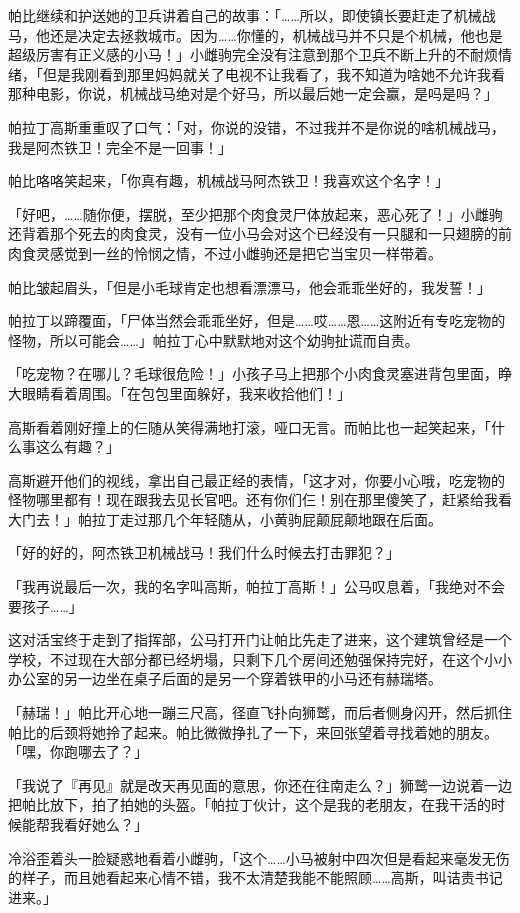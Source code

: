 帕比继续和护送她的卫兵讲着自己的故事：「……所以，即使镇长要赶走了机械战马，他还是决定去拯救城市。因为……你懂的，机械战马并不只是个机械，他也是超级厉害有正义感的小马！」小雌驹完全没有注意到那个卫兵不断上升的不耐烦情绪，「但是我刚看到那里妈妈就关了电视不让我看了，我不知道为啥她不允许我看那种电影，你说，机械战马绝对是个好马，所以最后她一定会赢，是吗是吗？」

帕拉丁高斯重重叹了口气：「对，你说的没错，不过我并不是你说的啥机械战马，我是阿杰铁卫！完全不是一回事！」

帕比咯咯笑起来，「你真有趣，机械战马阿杰铁卫！我喜欢这个名字！」

「好吧，……随你便，摆脱，至少把那个肉食灵尸体放起来，恶心死了！」小雌驹还背着那个死去的肉食灵，没有一位小马会对这个已经没有一只腿和一只翅膀的前肉食灵感觉到一丝的怜悯之情，不过小雌驹还是把它当宝贝一样带着。

帕比皱起眉头，「但是小毛球肯定也想看漂漂马，他会乖乖坐好的，我发誓！」

帕拉丁以蹄覆面，「尸体当然会乖乖坐好，但是……哎……恩……这附近有专吃宠物的怪物，所以可能会……」帕拉丁心中默默地对这个幼驹扯谎而自责。

「吃宠物？在哪儿？毛球很危险！」小孩子马上把那个小肉食灵塞进背包里面，睁大眼睛看着周围。「在包包里面躲好，我来收拾他们！」

高斯看着刚好撞上的仨随从笑得满地打滚，哑口无言。而帕比也一起笑起来，「什么事这么有趣？」

高斯避开他们的视线，拿出自己最正经的表情，「这才对，你要小心哦，吃宠物的怪物哪里都有！现在跟我去见长官吧。还有你们仨！别在那里傻笑了，赶紧给我看大门去！」帕拉丁走过那几个年轻随从，小黄驹屁颠屁颠地跟在后面。

「好的好的，阿杰铁卫机械战马！我们什么时候去打击罪犯？」

「我再说最后一次，我的名字叫高斯，帕拉丁高斯！」公马叹息着，「我绝对不会要孩子……」

这对活宝终于走到了指挥部，公马打开门让帕比先走了进来，这个建筑曾经是一个学校，不过现在大部分都已经坍塌，只剩下几个房间还勉强保持完好，在这个小小办公室的另一边坐在桌子后面的是另一个穿着铁甲的小马还有赫瑞塔。

「赫瑞！」帕比开心地一蹦三尺高，径直飞扑向狮鹫，而后者侧身闪开，然后抓住帕比的后颈将她拎了起来。帕比微微挣扎了一下，来回张望着寻找着她的朋友。「嘿，你跑哪去了？」

「我说了『再见』就是改天再见面的意思，你还在往南走么？」狮鹫一边说着一边把帕比放下，拍了拍她的头盔。「帕拉丁伙计，这个是我的老朋友，在我干活的时候能帮我看好她么？」

冷浴歪着头一脸疑惑地看着小雌驹，「这个……小马被射中四次但是看起来毫发无伤的样子，而且她看起来心情不错，我不太清楚我能不能照顾……高斯，叫诘责书记进来。」

